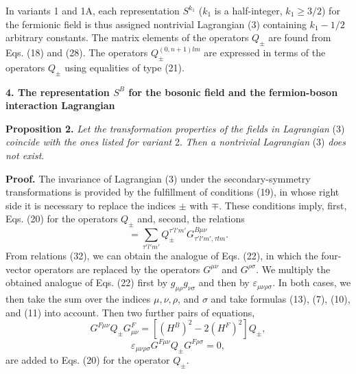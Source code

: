 \documentclass[a4paper,12pt]{article}
\begin{document}
In variants 1 and 1A, each representation $S^{k_{1}}$ ($k_{1}$ is a
half-integer, $k_{1} \geq 3/2$) for the fermionic field is thus assigned
nontrivial Lagrangian (3) containing $k_{1}-1/2$ arbitrary constants. The 
matrix elements of the operators $Q_{\pm}$ are found from Eqs. (18) and (28).
The operators $Q^{(0,n+1)lm}_{\pm}$ are expressed in terms of the operators
$Q_{\pm}$ using equalities of type (21).

\begin{center}
{\large \bf 4. The representation $S^{B}$ for the bosonic field and the
fermion-boson interaction Lagrangian}
\end{center}

{\bf Proposition 2.} {\it Let the transformation properties of the fields in 
Lagrangian} (3) {\it coincide with the ones listed for variant} 2. {\it Then a
nontrivial Lagrangian} (3) {\it does not exist}.

{\bf Proof.} The invariance of Lagrangian (3) under the secondary-symmetry
transformations is provided by the fulfillment of conditions (19), in whose
right side it is necessary to replace the indices $\pm$ with $\mp$. These
conditions imply, first, Eqs. (20) for the operators $Q_{\pm}$ and, second, the
relations
\begin{equation}
[G^{F \mu\nu}, Q^{\tau lm}_{\pm}] =
\sum_{\tau' l'm'} Q^{\tau' l'm'}_{\pm} 
G^{B \mu\nu}_{\tau' l'm', \tau lm}.
\end{equation}
From relations (32), we can obtain the analogue of Eqs. (22), in which the
four-vector operators are replaced by the operators $G^{\mu\nu}$ and 
$G^{\rho\sigma}$. We multiply the obtained analogue of Eqs. (22) first by 
$g_{\mu\rho}g_{\nu\sigma}$ and then by $\varepsilon_{\mu\nu\rho\sigma}$. In
both cases, we then take the sum over the indices $\mu, \nu, \rho$, and 
$\sigma$ and take formulas (13), (7), (10), and (11) into account. Then two
further pairs of equations,
\begin{equation}
G^{F \mu\nu}Q_{\pm}G^{F}_{\mu\nu}=[(H^{B})^{2}-2(H^{F})^{2}]Q_{\pm},
\end{equation}
\begin{equation}
\varepsilon_{\mu\nu\rho\sigma}G^{F \mu\nu}Q_{\pm}G^{F\rho\sigma}=0,
\end{equation}
are added to Eqs. (20) for the operator $Q_{\pm}$.
\end{document}
